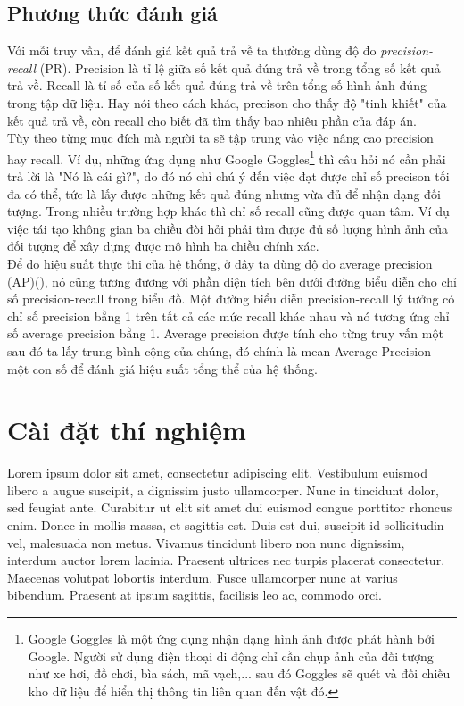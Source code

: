 \subsection{Phương thức đánh giá}
\label{evaluation}
Với mỗi truy vấn, để đánh giá kết quả trả về ta thường dùng độ đo \textit{precision-recall} (PR). Precision là tỉ lệ giữa số kết quả đúng trả về trong tổng số kết quả trả về. Recall là tỉ số của số kết quả đúng trả về trên tổng số hình ảnh đúng trong tập dữ liệu. Hay nói theo cách khác, precison cho thấy độ "tinh khiết" của kết quả trả về, còn recall cho biết đã tìm thấy bao nhiêu phần của đáp án.\\
Tùy theo từng mục đích mà người ta sẽ tập trung vào việc nâng cao precision hay recall. Ví dụ, những ứng dụng như Google Goggles\footnote{Google Goggles là một ứng dụng nhận dạng hình ảnh được phát hành bởi Google. Người sử dụng điện thoại di động chỉ cần chụp ảnh của đối tượng như xe hơi, đồ chơi, bìa sách, mã vạch,... sau đó Goggles sẽ quét và đối chiếu kho dữ liệu để hiển thị thông tin liên quan đến vật đó.} thì câu hỏi nó cần phải trả lời là "Nó là cái gì?", do đó nó chỉ chú ý đến việc đạt được chỉ số precison tối đa có thể, tức là lấy được những kết quả đúng nhưng vừa đủ để nhận dạng đối tượng. Trong nhiều trường hợp khác thì chỉ số recall cũng được quan tâm. Ví dụ việc tái tạo không gian ba chiều đòi hỏi phải tìm được đủ số lượng hình ảnh của đối tượng để xây dựng được mô hình ba chiều chính xác.\\
Để đo hiệu suất thực thi của hệ thống, ở đây ta dùng độ đo average precision (AP)(\cite{philbin2007object}), nó cũng tương đương với phần diện tích bên dưới đường biểu diễn cho chỉ số precision-recall trong biểu đồ. Một đường biểu diễn precision-recall lý tưởng có chỉ số precision bằng 1 trên tất cả các mức recall khác nhau và nó tương ứng chỉ số average precision bằng 1. Average precision được tính cho từng truy vấn một sau đó ta lấy trung bình cộng của chúng, đó chính là mean Average Precision - một con số để đánh giá hiệu suất tổng thể của hệ thống.

\section{Cài đặt thí nghiệm}
Lorem ipsum dolor sit amet, consectetur adipiscing elit. Vestibulum euismod libero a augue suscipit, a dignissim justo ullamcorper. Nunc in tincidunt dolor, sed feugiat ante. Curabitur ut elit sit amet dui euismod congue porttitor rhoncus enim. Donec in mollis massa, et sagittis est. Duis est dui, suscipit id sollicitudin vel, malesuada non metus. Vivamus tincidunt libero non nunc dignissim, interdum auctor lorem lacinia. Praesent ultrices nec turpis placerat consectetur. Maecenas volutpat lobortis interdum. Fusce ullamcorper nunc at varius bibendum. Praesent at ipsum sagittis, facilisis leo ac, commodo orci.

